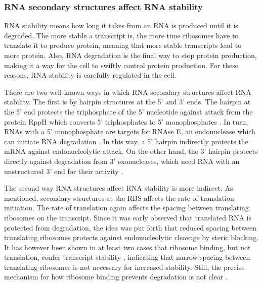 \subsubsection{RNA secondary structures affect RNA stability}
RNA stability means how long it takes from an RNA is produced until it is
degraded. The more stable a transcript is, the more time ribosomes have to
translate it to produce protein, meaning that more stable transcripts lead to
more protein. Also, RNA degradation is the final way to stop protein
production, making it a way for the cell to swiftly control protein production.
For these reasons, RNA stability is carefully regulated in the cell.

There are two well-known ways in which RNA secondary structures affect RNA
stability. The first is by hairpin structures at the 5' and 3' ends. The
hairpin at the 5' end protects the triphosphate of the 5' nucleotide against
attack from the protein RppH which converts 5' triphosphates to 5'
monophosphates \cite{deana_bacterial_2008}. In turn, RNAs with a 5'
monophosphate are targets for RNAse E, an endonuclease which can initiate RNA
degradation \cite{mackie_ribonuclease_1998}. In this way, a 5' hairpin
indirectly protects the mRNA against endonucleolytic attack. On the other hand,
the 3' hairpin protects directly against degradation from 3' exonucleases,
which need RNA with an unstructured 3' end for their activity
\cite{rauhut_mrna_1999}.

The second way RNA structures affect RNA stability is more indirect. As
mentioned, secondary structures at the RBS affects the rate of translation
initiation. The rate of translation again affects the spacing between
translating ribosomes on the transcript. Since it was early observed that
translated RNA is protected from degradation, the idea was put forth that
reduced spacing between translating ribosomes protects against endonucleolytic
cleavage by steric blocking. It has however been shown in at least two cases
that ribosome binding, but not translation, confer transcript stability
\cite{wagner_efficient_1994} \cite{hambraeus_5_2002}, indicating that narrow
spacing between translating ribosomes is not necessary for increased stability.
Still, the precise mechanism for how ribosome binding prevents degradation is
not clear \cite{deana_lost_2005}.

